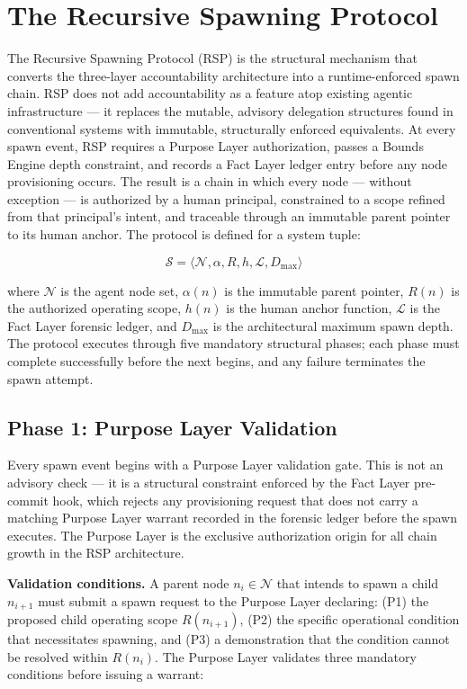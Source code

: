 \section{The Recursive Spawning Protocol}
\label{sec:rs-protocol}

The Recursive Spawning Protocol (RSP) is the structural mechanism that converts the three-layer \bxthree{} accountability architecture into a runtime-enforced spawn chain. RSP does not add accountability as a feature atop existing agentic infrastructure — it replaces the mutable, advisory delegation structures found in conventional systems with immutable, structurally enforced equivalents. At every spawn event, RSP requires a Purpose Layer authorization, passes a Bounds Engine depth constraint, and records a Fact Layer ledger entry before any node provisioning occurs. The result is a chain in which every node — without exception — is authorized by a human principal, constrained to a scope refined from that principal's intent, and traceable through an immutable parent pointer to its human anchor. The protocol is defined for a system tuple:

\[
\mathcal{S} = \langle \mathcal{N}, \alpha, R, h, \mathcal{L}, D_{\max} \rangle
\]

where $\mathcal{N}$ is the agent node set, $\alpha(n)$ is the immutable parent pointer, $R(n)$ is the authorized operating scope, $h(n)$ is the human anchor function, $\mathcal{L}$ is the Fact Layer forensic ledger, and $D_{\max}$ is the architectural maximum spawn depth. The protocol executes through five mandatory structural phases; each phase must complete successfully before the next begins, and any failure terminates the spawn attempt.

\subsection{Phase 1: Purpose Layer Validation}
\label{sec:rs-phase1}

Every spawn event begins with a Purpose Layer validation gate. This is not an advisory check — it is a structural constraint enforced by the Fact Layer pre-commit hook, which rejects any provisioning request that does not carry a matching Purpose Layer warrant recorded in the forensic ledger before the spawn executes. The Purpose Layer is the exclusive authorization origin for all chain growth in the RSP architecture.

\medskip
\noindent\textbf{Validation conditions.} A parent node $n_i \in \mathcal{N}$ that intends to spawn a child $n_{i+1}$ must submit a spawn request to the Purpose Layer declaring: (P1) the proposed child operating scope $R(n_{i+1})$, (P2) the specific operational condition that necessitates spawning, and (P3) a demonstration that the condition cannot be resolved within $R(n_i)$. The Purpose Layer validates three mandatory conditions before issuing a warrant:

